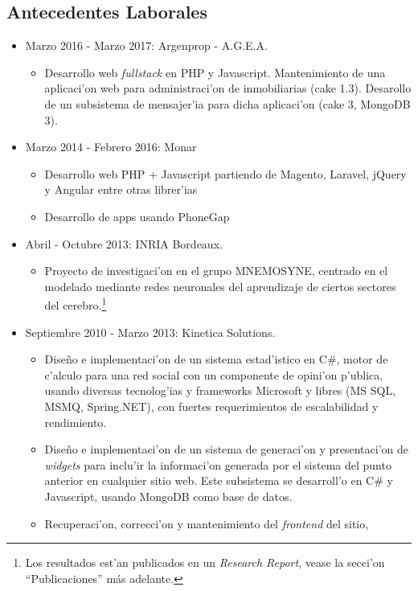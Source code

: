 \subsection*{Antecedentes Laborales}
\begin{itemize}
	\item Marzo 2016 - Marzo 2017: Argenprop - A.G.E.A.
		\begin{itemize}
			\item Desarrollo web \emph{fullstack} en PHP y Javascript.
				\subitem Mantenimiento de una aplicaci'on web para administraci'on de inmobiliarias (cake 1.3).
				\subitem Desarollo de un subsistema de mensajer'ia para dicha aplicaci'on (cake 3, MongoDB 3).
	\end{itemize}
	\item Marzo 2014 - Febrero 2016: Monar
		\begin{itemize}
			\item Desarrollo web PHP + Javascript partiendo de Magento, Laravel, jQuery y Angular
				entre otras librer'ias
			\item Desarrollo de apps usando PhoneGap
		\end{itemize}
	\item Abril - Octubre 2013: INRIA Bordeaux.
		\begin{itemize}
			\item Proyecto de investigaci'on en el grupo MNEMOSYNE, centrado en el modelado mediante
				redes neuronales del aprendizaje de ciertos sectores del cerebro.\footnote[1]{Los
					resultados est'an publicados en un \emph{Research Report}, vease la secci'on
					``Publicaciones'' más adelante.}
		\end{itemize}
	\item Septiembre 2010 - Marzo 2013: Kinetica Solutions.
		\begin{itemize}
			\item Dise\~no e implementaci'on de un sistema estad'istico en C\#,
				motor de c'alculo para una red social con un componente de opini'on p'ublica,
				usando diversas tecnolog'ias y frameworks Microsoft y libres (MS SQL, MSMQ,
				Spring.NET), con fuertes requerimientos de escalabilidad y rendimiento.
			\item Dise\~no e implementaci'on de un sistema de generaci'on y presentaci'on
				de \emph{widgets} para inclu'ir la informaci'on generada por el sistema del
				punto anterior en cualquier sitio web.  Este subsistema se desarroll'o en C\# y
				Javascript, usando MongoDB como base de datos.
			\item Recuperaci'on, correcci'on y mantenimiento del \emph{frontend} del sitio,

\end{itemize}
\end{itemize}
